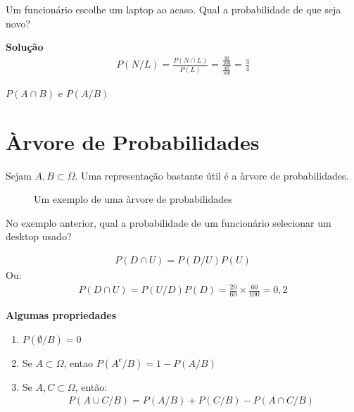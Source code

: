 \begin{description}
\begin{description}
\begin{example}
        Um funcionário escolhe um laptop ao acaso. Qual a probabilidade de que seja novo?

        \textbf{Solução}
        \begin{align*}
          P(N/L)= \frac{P(N \cap L)}{P(L)}= \frac{\frac{30}{100}}{\frac{40}{100}}=\frac{3}{4}
        \end{align*}

        \begin{obs}$P(A \cap B)$ e $P(A/B)$\end{obs}
      \end{example}
    \end{description}
    \section{Àrvore de Probabilidades}
    Sejam $A,B \subset \Omega$. Uma representação bastante útil é a àrvore de probabilidades.
      \begin{figure}[H]
        \centering
        
        \label{fig:17}
        \caption{Um exemplo de uma àrvore de probabilidades}
      \end{figure}
      \begin{example}
     No exemplo anterior, qual a probabilidade de um funcionário selecionar um 
      desktop usado?
      \begin{figure}[H]
        
        \label{fig:18}
      \end{figure}
      \begin{align*}
        P(D \cap U)= P(D/U)P(U)
      \end{align*}
      Ou:
      \begin{align*}
        P(D \cap U)= P(U/D)P(D)= \frac{20}{60}\times \frac{60}{100}= 0{,}2
      \end{align*}
    \end{example}

    \textbf{Algumas propriedades}

      \begin{enumerate}[label=(\alph*)]
        \item $P(\emptyset / B)=0$
        \item Se $A \subset \Omega$, entao $P(A^c / B)= 1-P(A/B)$
        \item Se $A,C \subset \Omega$, então:
          \begin{align}
            P(A \cup C / B)= P(A/B)+ P(C/B) - P(A \cap C/B)
          \end{align}
      \end{enumerate}


\end{description}
